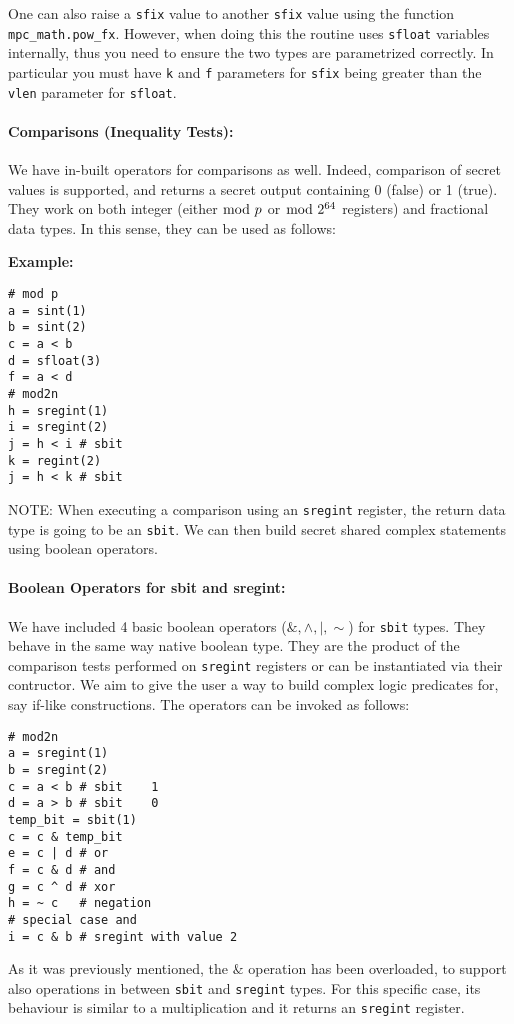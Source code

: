 One can also raise a \verb|sfix| value to another \verb|sfix| value using the
function \verb|mpc_math.pow_fx|. However, when doing this the routine uses
\verb|sfloat| variables internally, thus you need to ensure the two types
are parametrized correctly.
In particular you must have \verb|k| and \verb|f| parameters 
for \verb|sfix| being greater than the \verb|vlen| parameter for \verb|sfloat|.

\paragraph{Comparisons (Inequality Tests):}
We have in-built operators for comparisons as well.
Indeed, comparison of secret values is supported,
and returns a secret output containing 0 (false) or 1 (true).
They work on both integer (either $\bmod \; p$ or $\bmod \; 2^{64}$ registers) and fractional data types.
In this sense, they can be used as follows:

\noindent
\textbf{Example:}
\begin{lstlisting}
# mod p
a = sint(1)
b = sint(2)
c = a < b
d = sfloat(3)
f = a < d
# mod2n
h = sregint(1)
i = sregint(2)
j = h < i # sbit
k = regint(2)
j = h < k # sbit
\end{lstlisting}

\noindent
NOTE: When executing a comparison using an \verb|sregint| register, the return data type is going to be an \verb|sbit|. We can then build secret shared complex statements using boolean operators.

\paragraph{Boolean Operators for sbit and sregint:}
We have included 4 basic boolean operators ($\&, \wedge, |, \sim$) for \verb|sbit| types.
They behave in the same way native boolean type. They are the product of the
comparison tests performed on \verb|sregint| registers or can be instantiated
via their contructor.
We aim to give the user a way to build complex logic predicates for, say if-like constructions. The operators can be invoked as follows:
\begin{lstlisting}
# mod2n
a = sregint(1)
b = sregint(2)
c = a < b # sbit    1
d = a > b # sbit    0
temp_bit = sbit(1)
c = c & temp_bit
e = c | d # or
f = c & d # and
g = c ^ d # xor
h = ~ c   # negation
# special case and
i = c & b # sregint with value 2
\end{lstlisting}
As it was previously mentioned, the $\&$ operation has been overloaded,
to support also operations in between \verb|sbit| and \verb|sregint| types.
For this specific case, its behaviour is similar to a multiplication and it returns
an \verb|sregint| register.

